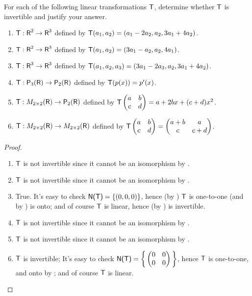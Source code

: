 \begin{exercise} \label{exercise 2.4.2}
For each of the following linear transformations \(\textsf{T}\), determine whether \(\textsf{T}\) is invertible and justify your answer.
\begin{enumerate}
\item \(\textsf{T} : \textsf{R}^2 \to \textsf{R}^3\) defined by \(\textsf{T}(a_1, a_2) = (a_1 - 2a_2, a_2, 3a_1 + 4a_2)\).
\item \(\textsf{T} : \textsf{R}^2 \to \textsf{R}^3\) defined by \(\textsf{T}(a_1, a_2) = (3a_1 - a_2, a_2, 4a_1)\).
\item \(\textsf{T} : \textsf{R}^3 \to \textsf{R}^3\) defined by \(\textsf{T}(a_1, a_2, a_3) = (3a_1 - 2a_3, a_2, 3a_1 + 4a_2)\).
\item \(\textsf{T} : \textsf{P}_3(\textsf{R}) \to \textsf{P}_2(\textsf{R})\) defined by \(\textsf{T}(p(x)) = p'(x)\).
\item \(\textsf{T}: M_{2 \times 2}(\textsf{R}) \to \textsf{P}_2(\textsf{R})\) defined by \(\textsf{T} \begin{pmatrix} a & b \\ c & d \end{pmatrix} = a + 2bx + (c + d)x^2\).
\item \(\textsf{T} : M_{2 \times 2}(\textsf{R}) \to M_{2 \times 2}(\textsf{R})\) defined by \(\textsf{T} \begin{pmatrix} a & b \\ c & d \end{pmatrix} = \begin{pmatrix} a + b & a \\ c & c + d \end{pmatrix}\).
\end{enumerate}
\end{exercise}

\begin{proof} \ 

\begin{enumerate}
\item \(\textsf{T}\) is not invertible since it cannot be an isomorphism by .
\item \(\textsf{T}\) is not invertible since it cannot be an isomorphism by .
\item True.
    It's easy to check \(\textsf{N(T)} = \{ (0, 0, 0) \}\), hence (by ) \(\textsf{T}\) is one-to-one (and by ) is onto;
    and of course \(\textsf{T}\) is linear, hence (by ) is invertible.
\item \(\textsf{T}\) is not invertible since it cannot be an isomorphism by .
\item \(\textsf{T}\) is not invertible since it cannot be an isomorphism by .
\item \(\textsf{T}\) is invertible;
    It's easy to check \(\textsf{N(T)} = \bigg\{ \begin{pmatrix} 0 & 0 \\ 0 & 0 \end{pmatrix} \bigg\}\), hence \(\textsf{T}\) is one-to-one, and onto by ;
    and of course \(\textsf{T}\) is linear.
\end{enumerate}
\end{proof}

